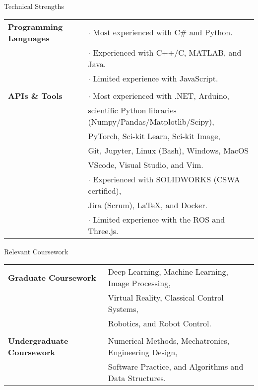 \documentclass{resume}
\begin{document}
  \begin{rSection}{Technical Strengths}
    \begin{tabular}{ @{} >{\bfseries}l @{\hspace{3ex}} l }
      Programming Languages
      & $\cdot$ Most experienced with C\# and Python. \\
      & $\cdot$ Experienced with C++/C, MATLAB, and Java. \\
      & $\cdot$ Limited experience with JavaScript. \\
      
      & \\

      APIs \& Tools 
      & $\cdot$ Most experienced with .NET, Arduino, \\ 
      & \phantom{$\cdot$} scientific Python libraries (Numpy/Pandas/Matplotlib/Scipy), \\
      & \phantom{$\cdot$} PyTorch, Sci-kit Learn, Sci-kit Image, \\
      & \phantom{$\cdot$} Git, Jupyter, Linux (Bash), Windows, MacOS \\
      & \phantom{$\cdot$} VScode, Visual Studio, and Vim. \\
      & $\cdot$ Experienced with SOLIDWORKS (CSWA certified), \\ 
      & \phantom{$\cdot$} Jira (Scrum), LaTeX, and Docker.\\
      & $\cdot$ Limited experience with the ROS and Three.js. \\
    \end{tabular}
  \end{rSection}
  
  \begin{rSection}{Relevant Coursework}
    \begin{tabular}{ @{} >{\bfseries}l @{\hspace{1ex}} l }
      Graduate Coursework
      & Deep Learning, Machine Learning, Image Processing,\\
      & Virtual Reality, Classical Control Systems,\\
      & Robotics, and Robot Control.\\

      & \\

      Undergraduate Coursework
      & Numerical Methods, Mechatronics, Engineering Design, \\
      & Software Practice, and Algorithms and Data Structures. \\
    \end{tabular}
  \end{rSection}
\end{document}
